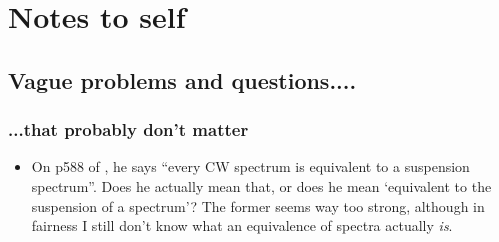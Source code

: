 \documentclass{MetricNotes2023}
\def\bb{\ensuremath\mathbb}
\def\subq{\ensuremath\subseteq}
\def\inte{\ensuremath\mathbb{Z}}
\begin{document}
\section{Notes to self}\label{C}

\subsection{Vague problems and questions....}

\subsubsection{...that probably don't matter}

\begin{itemize}


\item On p588 of \autocite{hatcher5}, he says ``every CW spectrum is equivalent to a suspension spectrum''. Does he actually mean that, or does he mean `equivalent to the suspension of a spectrum'? The former seems way too strong, although in fairness I still don't know what an equivalence of spectra actually \textit{is}. 



\end{itemize}
\end{document}
